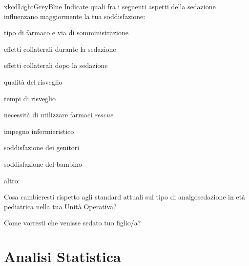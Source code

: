 \begin{survey}{xkcdLightGreyBlue}
       \Query Indicate quali fra i seguenti aspetti della sedazione influenzano maggiormente la tua soddisfazione:
       \begin{Qlist}
            \item tipo di farmaco e via di somministrazione
            \item effetti collaterali durante la sedazione
            \item effetti collaterali dopo la sedazione
            \item qualità del risveglio
            \item tempi di risveglio
            \item necessità di utilizzare farmaci \emph{rescue}
            \item impegno infermieristico
            \item soddisfazione dei genitori
            \item soddisfazione del bambino
            \item altro: \Qline{6cm}
       \end{Qlist}
       
       \Query Cosa cambieresti rispetto agli standard attuali sul tipo di analgosedazione in età pediatrica nella tua Unità Operativa? 
       
       \Query Come vorresti che venisse sedato tuo figlio/a? 
       
       \bigskip
       
\end{survey}

\section{Analisi Statistica}

